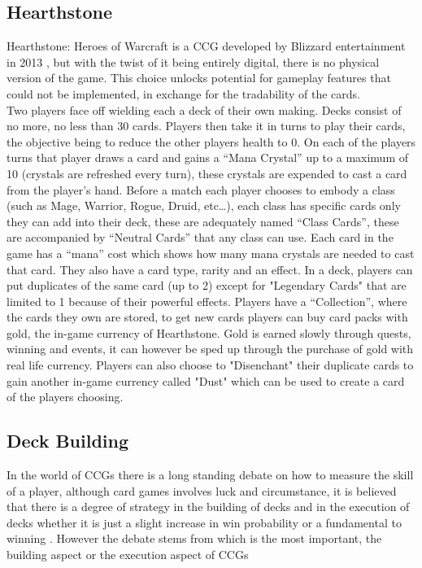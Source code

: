 \documentclass{report}
\begin{document}
\subsection{Hearthstone}
	Hearthstone: Heroes of Warcraft is a CCG developed by Blizzard entertainment in 2013 \cite{HS}, but with the twist of it being entirely digital, there is no physical version of the game. This choice unlocks potential for gameplay features that could not be implemented, in exchange for the tradability of the cards. \\ \indent Two players face off wielding each a deck of their own making. Decks consist of no more, no less than 30 cards. Players then take it in turns to play their cards, the objective being to reduce the other players health to 0. On each of the players turns that player draws a card and gains a “Mana Crystal” up to a maximum of 10 (crystals are refreshed every turn), these crystals are expended to cast a card from the player's hand. Before a match each player chooses to embody a class (such as Mage, Warrior, Rogue, Druid, etc…), each class has specific cards only they can add into their deck, these are adequately named “Class Cards”, these are accompanied by “Neutral Cards” that any class can use. Each card in the game has a “mana” cost which shows how many mana crystals are needed to cast that card. They also have a card type, rarity and an effect. In a deck, players can put duplicates of the same card (up to 2) except for "Legendary Cards" that are limited to 1 because of their powerful effects.  Players have a “Collection”, where the cards they own are stored, to get new cards players can buy card packs with gold, the in-game currency of Hearthstone. Gold is earned slowly through quests, winning and events, it can however be sped up through the purchase of gold with real life currency. Players can also choose to "Disenchant" their duplicate cards to gain another in-game currency called "Dust" which can be used to create a card of the players choosing.
\subsection{Deck Building}
	In the world of CCGs there is a long standing debate on how to measure the skill of a player, although card games involves luck and circumstance, it is believed that there is a degree of strategy in the building of decks and in the execution of decks whether it is just a slight increase in win probability or a fundamental to winning \cite{SvsL}. However the debate stems from which is the most important, the building aspect or the execution aspect of CCGs
	\cite{BvsP}
\end{document}
